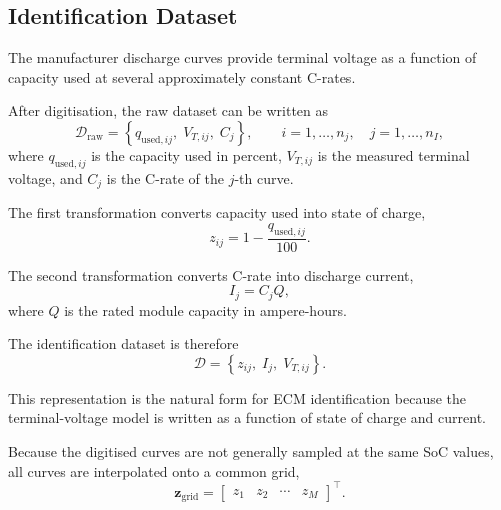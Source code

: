 \documentclass[a4paper,12pt]{article}
\newcommand{\mat}[1]{\mathbf{#1}}
\begin{document}
\subsection{Identification Dataset}

The manufacturer discharge curves provide terminal voltage as a function of capacity used at several approximately constant C-rates.

After digitisation, the raw dataset can be written as
\begin{equation}
\mathcal{D}_{\mathrm{raw}}
=
\left\{
q_{\mathrm{used},ij},
\;
V_{T,ij},
\;
C_j
\right\},
\qquad
i=1,\ldots,n_j,
\quad
j=1,\ldots,n_I,
\label{eq:method_raw_dataset}
\end{equation}
where \(q_{\mathrm{used},ij}\) is the capacity used in percent, \(V_{T,ij}\) is the measured terminal voltage, and \(C_j\) is the C-rate of the \(j\)-th curve.

The first transformation converts capacity used into state of charge,
\begin{equation}
z_{ij}
=
1
-
\frac{q_{\mathrm{used},ij}}{100}.
\label{eq:method_soc_from_capacity}
\end{equation}

The second transformation converts C-rate into discharge current,
\begin{equation}
I_j
=
C_jQ,
\label{eq:method_current_from_crate}
\end{equation}
where \(Q\) is the rated module capacity in ampere-hours.

The identification dataset is therefore
\begin{equation}
\mathcal{D}
=
\left\{
z_{ij},
\;
I_j,
\;
V_{T,ij}
\right\}.
\label{eq:method_identification_dataset}
\end{equation}

This representation is the natural form for ECM identification because the terminal-voltage model is written as a function of state of charge and current.

Because the digitised curves are not generally sampled at the same SoC values, all curves are interpolated onto a common grid,
\begin{equation}
\mat{z}_{\mathrm{grid}}
=
\begin{bmatrix}
z_1 & z_2 & \cdots & z_M
\end{bmatrix}^{\top}.
\label{eq:method_soc_grid}
\end{equation}
\end{document}
